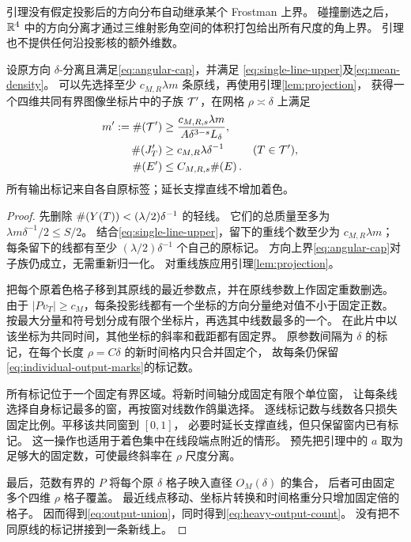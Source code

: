\begin{remark}
引理没有假定投影后的方向分布自动继承某个 Frostman 上界。
碰撞删选之后，$\mathbb R^4$ 中的方向分离才通过三维射影角空间的体积打包给出所有尺度的角上界。
引理也不提供任何沿投影核的额外维数。
\end{remark}

\begin{lemma}\label{lem:marks}
设原方向 $\delta$-分离且满足\eqref{eq:angular-cap}，并满足
\eqref{eq:single-line-upper}及\eqref{eq:mean-density}。
可以先选择至少 $c_{M,R}\lambda m$ 条原线，再使用引理\ref{lem:projection}，
获得一个四维共同有界图像坐标片中的子族 $\mathcal T'$，在网格 $\rho\asymp\delta$ 上满足
\begin{align}
 m':=\#\!\left(\mathcal T'\right)&\ge
 \frac{c_{M,R,s}\lambda m}{A\delta^{3-s}L_\delta},\label{eq:heavy-output-count}\\
 \#\!\left(J'_T\right)&\ge c_{M,R}\lambda\delta^{-1}
       &&(T\in\mathcal T'),\label{eq:individual-output-marks}\\
 \#\!\left(E'\right)&\le C_{M,R,s}\#\!\left(E\right).\label{eq:output-union}
\end{align}
所有输出标记来自各自原标签；延长支撑直线不增加着色。
\end{lemma}

\begin{proof}
先删除 $\#\!\left(Y(T)\right)<(\lambda/2)\delta^{-1}$ 的轻线。
它们的总质量至多为 $\lambda m\delta^{-1}/2\le S/2$。
结合\eqref{eq:single-line-upper}，留下的重线个数至少为 $c_{M,R}\lambda m$；
每条留下的线都有至少 $(\lambda/2)\delta^{-1}$ 个自己的原标记。
方向上界\eqref{eq:angular-cap}对子族仍成立，无需重新归一化。
对重线族应用引理\ref{lem:projection}。

把每个原着色格子移到其原线的最近参数点，并在原线参数上作固定重数删选。
由于 $|Pv_T|\ge c_M$，每条投影线都有一个坐标的方向分量绝对值不小于固定正数。
按最大分量和符号划分成有限个坐标片，再选其中线数最多的一个。
在此片中以该坐标为共同时间，其他坐标的斜率和截距都有固定界。
原参数间隔为 $\delta$ 的标记，在每个长度 $\rho=C\delta$ 的新时间格内只合并固定个，
故每条仍保留\eqref{eq:individual-output-marks}的标记数。

所有标记位于一个固定有界区域。将新时间轴分成固定有限个单位窗，
让每条线选择自身标记最多的窗，再按窗对线数作鸽巢选择。
逐线标记数与线数各只损失固定比例。平移该共同窗到 $[0,1]$，
必要时延长支撑直线，但只保留窗内已有标记。
这一操作也适用于着色集中在线段端点附近的情形。
预先把引理中的 $a$ 取为足够大的固定数，可使最终斜率在 $\rho$ 尺度分离。

最后，范数有界的 $P$ 将每个原 $\delta$ 格子映入直径 $O_M(\delta)$ 的集合，
后者可由固定多个四维 $\rho$ 格子覆盖。
最近线点移动、坐标片转换和时间格重分只增加固定倍的格子。
因而得到\eqref{eq:output-union}，同时得到\eqref{eq:heavy-output-count}。
没有把不同原线的标记拼接到一条新线上。
\end{proof}
